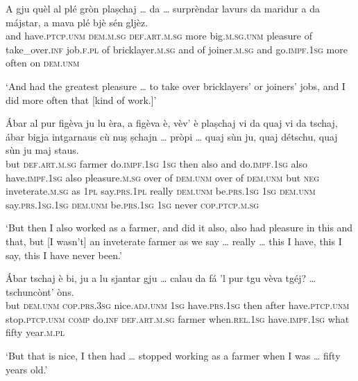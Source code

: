 \begin{linenumbers}
\gll    A gju quèl al plé gròn plaṣchaj … da … surprèndar lavurs da maridur a da májstar, a mava plé bjè sén gljèz.\\
and have.\textsc{ptcp.unm} \textsc{dem.m.sg} \textsc{def.art.m.sg} more big.\textsc{m.sg.unm} pleasure {} of {}  take\_over.\textsc{inf} job.\textsc{f.pl} of bricklayer.\textsc{m.sg} and of joiner.\textsc{m.sg} and  go.\textsc{impf.1sg} more often on \textsc{dem.unm}\\
\end{linenumbers}
\medskip
\glt `And had the greatest pleasure … to take over bricklayers’ or joiners’ jobs, and I did more often that [kind of work.]'
\medskip

\begin{linenumbers}
\gll    Ábar al pur figèva ju lu èra, a figèva è, vèv’ è plaṣchaj vi da quaj vi da tschaj, ábar bigja intgarnaus  cù nuṣ ṣchajn … pròpi … quaj sùn ju, quaj détschu, quaj sùn ju maj staus.\\
but \textsc{def.art.m.sg} farmer do.\textsc{impf.1sg} \textsc{1sg} then also and  do.\textsc{impf.1sg} also have.\textsc{impf.1sg} also pleasure.\textsc{m.sg} over of \textsc{dem.unm} over  of \textsc{dem.unm} but  \textsc{neg} inveterate.\textsc{m.sg} as \textsc{1pl} say.\textsc{prs.1pl} {} really {} \textsc{dem.unm} be.\textsc{prs.1sg} \textsc{1sg} \textsc{dem.unm} say.\textsc{prs.1sg.1sg} \textsc{dem.unm} be.\textsc{prs.1sg} \textsc{1sg} never  \textsc{cop.ptcp.m.sg}\\
\end{linenumbers}
\medskip
\glt `But then I also worked as a farmer, and did it also, also had pleasure in this and that, but [I wasn’t] an inveterate farmer as we say … really … this I have, this I say, this I have never been.'
\medskip

\begin{linenumbers}
\gll    Ábar tschaj è bi, ju a lu sjantar gju … calau da fá 'l pur tgu vèva tgéj? … tschuncònt’ òns.\\
but \textsc{dem.unm} \textsc{cop.prs.3sg} nice.\textsc{adj.unm} \textsc{1sg} have.\textsc{prs.1sg} then after have.\textsc{ptcp.unm} {} stop.\textsc{ptcp.unm} \textsc{comp} do.\textsc{inf} \textsc{def.art.m.sg} farmer when.\textsc{rel.1sg} have.\textsc{impf.1sg} what {} fifty year.\textsc{m.pl}\\
\end{linenumbers}
\medskip
\glt `But that is nice, I then had … stopped working as a farmer when I was … fifty years old.'
\medskip

